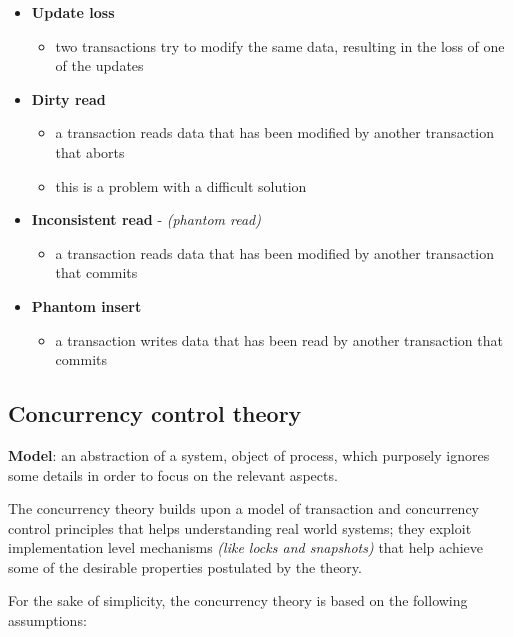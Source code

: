\documentclass[english]{article}
\begin{document}
\begin{itemize}
  \item \textbf{Update loss}
        \begin{itemize}
          \item two transactions try to modify the same data, resulting in the loss of one of the updates
        \end{itemize}
  \item \textbf{Dirty read}
        \begin{itemize}
          \item a transaction reads data that has been modified by another transaction that aborts
          \item this is a problem with a difficult solution
        \end{itemize}
  \item \textbf{Inconsistent read} - \textit{(phantom read)}
        \begin{itemize}
          \item a transaction reads data that has been modified by another transaction that commits
        \end{itemize}
  \item \textbf{Phantom insert}
        \begin{itemize}
          \item a transaction writes data that has been read by another transaction that commits
        \end{itemize}
\end{itemize}

\subsection{Concurrency control theory}

\textbf{Model}: an abstraction of a system, object of process, which purposely ignores some details in order to focus on the relevant aspects.

The concurrency theory builds upon a model of transaction and concurrency control principles that helps understanding real world systems;
they exploit implementation level mechanisms \textit{(like locks and snapshots)} that help achieve some of the desirable properties postulated by the theory.

For the sake of simplicity, the concurrency theory is based on the following assumptions:
\end{document}
